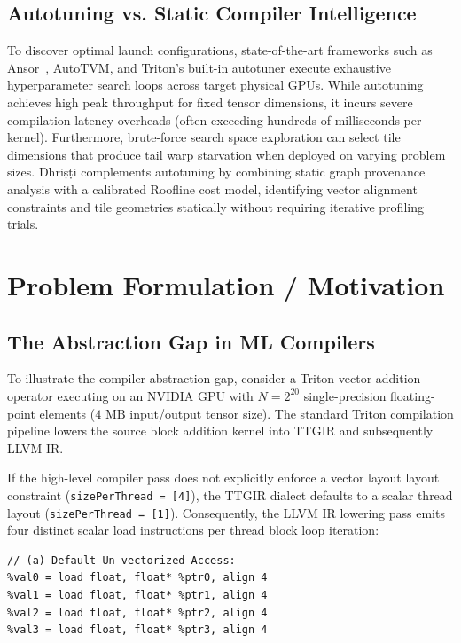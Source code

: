 \documentclass[10pt,journal,compsoc]{IEEEtran}
\begin{document}
\subsection{Autotuning vs. Static Compiler Intelligence}
To discover optimal launch configurations, state-of-the-art frameworks such as Ansor~\cite{zheng2020ansor}, AutoTVM, and Triton's built-in autotuner execute exhaustive hyperparameter search loops across target physical GPUs. While autotuning achieves high peak throughput for fixed tensor dimensions, it incurs severe compilation latency overheads (often exceeding hundreds of milliseconds per kernel). Furthermore, brute-force search space exploration can select tile dimensions that produce tail warp starvation when deployed on varying problem sizes. Dhri\d{s}\d{t}i complements autotuning by combining static graph provenance analysis with a calibrated Roofline cost model, identifying vector alignment constraints and tile geometries statically without requiring iterative profiling trials.

\section{Problem Formulation / Motivation}\label{sec:problem}

\subsection{The Abstraction Gap in ML Compilers}
To illustrate the compiler abstraction gap, consider a Triton vector addition operator executing on an NVIDIA GPU with $N = 2^{20}$ single-precision floating-point elements ($4\text{ MB}$ input/output tensor size). The standard Triton compilation pipeline lowers the source block addition kernel into TTGIR and subsequently LLVM IR.

If the high-level compiler pass does not explicitly enforce a vector layout layout constraint (\texttt{sizePerThread = [4]}), the TTGIR dialect defaults to a scalar thread layout (\texttt{sizePerThread = [1]}). Consequently, the LLVM IR lowering pass emits four distinct scalar load instructions per thread block loop iteration:

\begin{lstlisting}
// (a) Default Un-vectorized Access:
%val0 = load float, float* %ptr0, align 4
%val1 = load float, float* %ptr1, align 4
%val2 = load float, float* %ptr2, align 4
%val3 = load float, float* %ptr3, align 4
\end{lstlisting}
\end{document}
